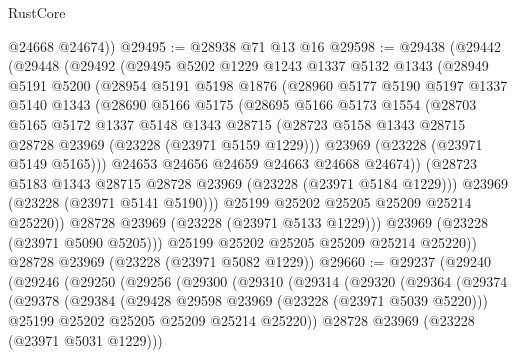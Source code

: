 \begin{lexlean}{RustCore}
\begin{coremodule}
        @24668
        @24674))
@29495 := @28938 @71 @13 @16
@29598 := @29438
    (@29442
      (@29448
        (@29492
          (@29495
            @5202
            @1229
            @1243
            @1337
            @5132
            @1343
            (@28949
              @5191
              @5200
              (@28954
                @5191
                @5198
                @1876
                (@28960
                  @5177
                  @5190
                  @5197
                  @1337
                  @5140
                  @1343
                  (@28690
                    @5166
                    @5175
                    (@28695
                      @5166
                      @5173
                      @1554
                      (@28703
                        @5165
                        @5172
                        @1337
                        @5148
                        @1343
                        @28715
                        (@28723 @5158 @1343 @28715 @28728 @23969 (@23228 (@23971 @5159 @1229)))
                        @23969
                        (@23228 (@23971 @5149 @5165)))
                      @24653
                      @24656
                      @24659
                      @24663
                      @24668
                      @24674))
                  (@28723 @5183 @1343 @28715 @28728 @23969 (@23228 (@23971 @5184 @1229)))
                  @23969
                  (@23228 (@23971 @5141 @5190)))
                @25199
                @25202
                @25205
                @25209
                @25214
                @25220))
            @28728
            @23969
            (@23228 (@23971 @5133 @1229)))
          @23969
          (@23228 (@23971 @5090 @5205)))
        @25199
        @25202
        @25205
        @25209
        @25214
        @25220))
    @28728
    @23969
    (@23228 (@23971 @5082 @1229))
@29660 := @29237
    (@29240
      (@29246
        (@29250
          (@29256
            (@29300
              (@29310
                (@29314
                  (@29320
                    (@29364
                      (@29374
                        (@29378
                          (@29384
                            (@29428 @29598 @23969 (@23228 (@23971 @5039 @5220)))
                            @25199
                            @25202
                            @25205
                            @25209
                            @25214
                            @25220))
                        @28728
                        @23969
                        (@23228 (@23971 @5031 @1229)))

\end{coremodule}
\end{lexlean}
